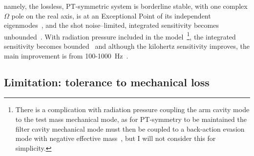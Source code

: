 namely, the lossless, PT-symmetric system is borderline stable, with one complex $\Omega$ pole on the real axis, is at an Exceptional Point of its independent eigenmodes~\cite{liBroadbandSensitivityImprovement2020}, and the shot noise--limited, integrated sensitivity becomes unbounded~\cite{}. With radiation pressure included in the model~\footnote{There is a complication with radiation pressure coupling the arm cavity mode to the test mass mechanical mode, as for PT-symmetry to be maintained the filter cavity mechanical mode must then be coupled to a back-action evasion mode with negative effective mass~\cite{}, but I will not consider this for simplicity.}, the integrated sensitivity becomes bounded~\cite{} and although the kilohertz sensitivity improves, the main improvement is from 100-1000~Hz~\cite{}. %



\subsection{Limitation: tolerance to mechanical loss}
\label{sec:sWLC_loss}

